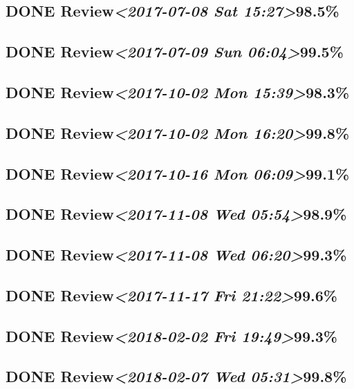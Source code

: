 \documentclass[11pt]{ctexart}
\begin{document}
\subsection{{\bfseries\sffamily DONE} Review\textit{<2017-07-08 Sat 15:27>}98.5\%}
\label{sec:orgffaa4e9}
\subsection{{\bfseries\sffamily DONE} Review\textit{<2017-07-09 Sun 06:04>}99.5\%}
\label{sec:org2a3f43f}
\subsection{{\bfseries\sffamily DONE} Review\textit{<2017-10-02 Mon 15:39>}98.3\%}
\label{sec:org462d588}
\subsection{{\bfseries\sffamily DONE} Review\textit{<2017-10-02 Mon 16:20>}99.8\%}
\label{sec:org60bc5f5}
\subsection{{\bfseries\sffamily DONE} Review\textit{<2017-10-16 Mon 06:09>}99.1\%}
\label{sec:org2c17664}

\subsection{{\bfseries\sffamily DONE} Review\textit{<2017-11-08 Wed 05:54>}98.9\%}
\label{sec:org74deac8}
\subsection{{\bfseries\sffamily DONE} Review\textit{<2017-11-08 Wed 06:20>}99.3\%}
\label{sec:org1d2e612}
\subsection{{\bfseries\sffamily DONE} Review\textit{<2017-11-17 Fri 21:22>}99.6\%}
\label{sec:org1a4a8d9}
\subsection{{\bfseries\sffamily DONE} Review\textit{<2018-02-02 Fri 19:49>}99.3\%}
\label{sec:org0889c39}
\subsection{{\bfseries\sffamily DONE} Review\textit{<2018-02-07 Wed 05:31>}99.8\%}
\label{sec:org2fccb94}
\end{document}
